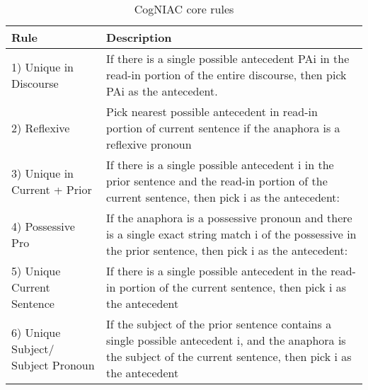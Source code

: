 \begin{table}[h]
  \caption{CogNIAC core rules}
    \begin{tabular}{| l |p{8cm} |}
    \hline
    Rule & Description \\ \hline
\hline
    1) Unique in Discourse & If there is a single possible antecedent PAi in the read-in portion of the entire discourse, then pick PAi as the antecedent. \\ \hline
    2) Reflexive & Pick nearest possible antecedent in read-in portion of current sentence if the anaphora is a reflexive pronoun \\ \hline
    3) Unique in Current + Prior & If there is a single possible antecedent i in the prior sentence and the read-in portion of the current sentence, then pick i as the antecedent: \\ \hline
    4) Possessive Pro & If the anaphora is a possessive pronoun and there is a single exact string match i of the possessive in the prior sentence, then pick i as the antecedent:  \\ \hline
    5) Unique Current Sentence & If there is a single possible antecedent in the read-in portion of the current sentence, then pick i as the antecedent  \\ \hline
    6) Unique Subject/ Subject Pronoun & If the subject of the prior sentence contains a single possible antecedent i, and the anaphora is the subject of the current sentence, then pick i as the antecedent \\ \hline
    \end{tabular}
     \label{table:cogniacRules}
\end{table}

~\\
